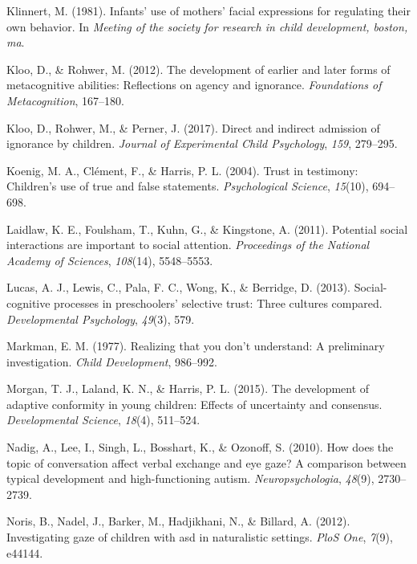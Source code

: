 \documentclass[man]{apa6}
\theoremstyle{definition}
\theoremstyle{definition}
\theoremstyle{definition}
\theoremstyle{remark}
\begin{document}
\hypertarget{ref-klinnert1981infants}{}
Klinnert, M. (1981). Infants' use of mothers' facial expressions for
regulating their own behavior. In \emph{Meeting of the society for
research in child development, boston, ma}.

\hypertarget{ref-kloo2012development}{}
Kloo, D., \& Rohwer, M. (2012). The development of earlier and later
forms of metacognitive abilities: Reflections on agency and ignorance.
\emph{Foundations of Metacognition}, 167--180.

\hypertarget{ref-kloo2017direct}{}
Kloo, D., Rohwer, M., \& Perner, J. (2017). Direct and indirect
admission of ignorance by children. \emph{Journal of Experimental Child
Psychology}, \emph{159}, 279--295.

\hypertarget{ref-koenig2004trust}{}
Koenig, M. A., Clément, F., \& Harris, P. L. (2004). Trust in testimony:
Children's use of true and false statements. \emph{Psychological
Science}, \emph{15}(10), 694--698.

\hypertarget{ref-laidlaw2011potential}{}
Laidlaw, K. E., Foulsham, T., Kuhn, G., \& Kingstone, A. (2011).
Potential social interactions are important to social attention.
\emph{Proceedings of the National Academy of Sciences}, \emph{108}(14),
5548--5553.

\hypertarget{ref-lucas2013social}{}
Lucas, A. J., Lewis, C., Pala, F. C., Wong, K., \& Berridge, D. (2013).
Social-cognitive processes in preschoolers' selective trust: Three
cultures compared. \emph{Developmental Psychology}, \emph{49}(3), 579.

\hypertarget{ref-markman1977realizing}{}
Markman, E. M. (1977). Realizing that you don't understand: A
preliminary investigation. \emph{Child Development}, 986--992.

\hypertarget{ref-morgan2015development}{}
Morgan, T. J., Laland, K. N., \& Harris, P. L. (2015). The development
of adaptive conformity in young children: Effects of uncertainty and
consensus. \emph{Developmental Science}, \emph{18}(4), 511--524.

\hypertarget{ref-nadig2010does}{}
Nadig, A., Lee, I., Singh, L., Bosshart, K., \& Ozonoff, S. (2010). How
does the topic of conversation affect verbal exchange and eye gaze? A
comparison between typical development and high-functioning autism.
\emph{Neuropsychologia}, \emph{48}(9), 2730--2739.

\hypertarget{ref-noris2012investigating}{}
Noris, B., Nadel, J., Barker, M., Hadjikhani, N., \& Billard, A. (2012).
Investigating gaze of children with asd in naturalistic settings.
\emph{PloS One}, \emph{7}(9), e44144.
\end{document}
